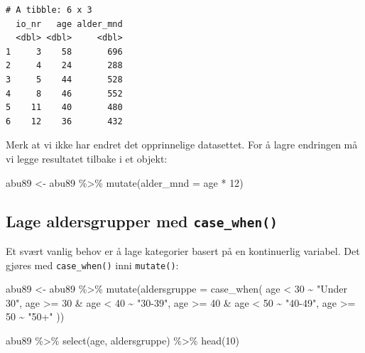 \documentclass[
  norsk,
  letterpaper,
  DIV=11,
  numbers=noendperiod]{scrreprt}
\newenvironment{Shaded}{\begin{snugshade}}{\end{snugshade}}
\newcommand{\AttributeTok}[1]{\textcolor[rgb]{0.40,0.45,0.13}{#1}}
\newcommand{\DecValTok}[1]{\textcolor[rgb]{0.68,0.00,0.00}{#1}}
\newcommand{\FunctionTok}[1]{\textcolor[rgb]{0.28,0.35,0.67}{#1}}
\newcommand{\NormalTok}[1]{\textcolor[rgb]{0.00,0.23,0.31}{#1}}
\newcommand{\OtherTok}[1]{\textcolor[rgb]{0.00,0.23,0.31}{#1}}
\newcommand{\SpecialCharTok}[1]{\textcolor[rgb]{0.37,0.37,0.37}{#1}}
\newcommand{\StringTok}[1]{\textcolor[rgb]{0.13,0.47,0.30}{#1}}
\theoremstyle{definition}
\theoremstyle{remark}
\begin{document}
\begin{verbatim}
# A tibble: 6 x 3
  io_nr   age alder_mnd
  <dbl> <dbl>     <dbl>
1     3    58       696
2     4    24       288
3     5    44       528
4     8    46       552
5    11    40       480
6    12    36       432
\end{verbatim}

Merk at vi ikke har endret det opprinnelige datasettet. For å lagre
endringen må vi legge resultatet tilbake i et objekt:

\begin{Shaded}
\begin{Highlighting}[]
\NormalTok{abu89 }\OtherTok{\textless{}{-}}\NormalTok{ abu89 }\SpecialCharTok{\%\textgreater{}\%}
  \FunctionTok{mutate}\NormalTok{(}\AttributeTok{alder\_mnd =}\NormalTok{ age }\SpecialCharTok{*} \DecValTok{12}\NormalTok{)}
\end{Highlighting}
\end{Shaded}

\subsection{\texorpdfstring{Lage aldersgrupper med
\texttt{case\_when()}}{Lage aldersgrupper med case\_when()}}\label{lage-aldersgrupper-med-case_when}

Et svært vanlig behov er å lage kategorier basert på en kontinuerlig
variabel. Det gjøres med \texttt{case\_when()} inni \texttt{mutate()}:

\begin{Shaded}
\begin{Highlighting}[]
\NormalTok{abu89 }\OtherTok{\textless{}{-}}\NormalTok{ abu89 }\SpecialCharTok{\%\textgreater{}\%}
  \FunctionTok{mutate}\NormalTok{(}\AttributeTok{aldersgruppe =} \FunctionTok{case\_when}\NormalTok{(}
\NormalTok{    age }\SpecialCharTok{\textless{}} \DecValTok{30}              \SpecialCharTok{\textasciitilde{}} \StringTok{"Under 30"}\NormalTok{,}
\NormalTok{    age }\SpecialCharTok{\textgreater{}=} \DecValTok{30} \SpecialCharTok{\&}\NormalTok{ age }\SpecialCharTok{\textless{}} \DecValTok{40}  \SpecialCharTok{\textasciitilde{}} \StringTok{"30{-}39"}\NormalTok{,}
\NormalTok{    age }\SpecialCharTok{\textgreater{}=} \DecValTok{40} \SpecialCharTok{\&}\NormalTok{ age }\SpecialCharTok{\textless{}} \DecValTok{50}  \SpecialCharTok{\textasciitilde{}} \StringTok{"40{-}49"}\NormalTok{,}
\NormalTok{    age }\SpecialCharTok{\textgreater{}=} \DecValTok{50}             \SpecialCharTok{\textasciitilde{}} \StringTok{"50+"}
\NormalTok{  ))}

\NormalTok{abu89 }\SpecialCharTok{\%\textgreater{}\%}
  \FunctionTok{select}\NormalTok{(age, aldersgruppe) }\SpecialCharTok{\%\textgreater{}\%}
  \FunctionTok{head}\NormalTok{(}\DecValTok{10}\NormalTok{)}
\end{Highlighting}
\end{Shaded}
\end{document}
